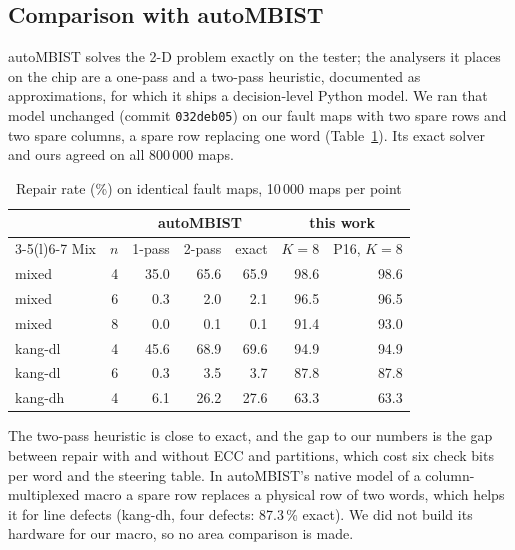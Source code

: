 \documentclass[conference]{IEEEtran}
\begin{document}
\subsection{Comparison with autoMBIST}
autoMBIST \cite{automb} solves the 2-D problem exactly on the tester; the analysers it places on the
chip are a one-pass and a two-pass heuristic, documented as approximations, for which it ships a
decision-level Python model. We ran that model unchanged (commit \texttt{032deb05}) on our fault maps
with two spare rows and two spare columns, a spare row replacing one word (Table~\ref{tab:amb}). Its
exact solver and ours agreed on all 800\,000 maps.

\begin{table}[t]
\caption{Repair rate (\%) on identical fault maps, 10\,000 maps per point}
\label{tab:amb}
\centering
\begin{tabular}{@{}lrrrrrr@{}}
\toprule
 & & \multicolumn{3}{c}{autoMBIST} & \multicolumn{2}{c}{this work} \\
\cmidrule(lr){3-5}\cmidrule(l){6-7}
Mix & $n$ & 1-pass & 2-pass & exact & $K{=}8$ & P16, $K{=}8$ \\
\midrule
mixed & 4 & 35.0 & 65.6 & 65.9 & 98.6 & 98.6 \\
mixed & 6 & 0.3 & 2.0 & 2.1 & 96.5 & 96.5 \\
mixed & 8 & 0.0 & 0.1 & 0.1 & 91.4 & 93.0 \\
kang-dl & 4 & 45.6 & 68.9 & 69.6 & 94.9 & 94.9 \\
kang-dl & 6 & 0.3 & 3.5 & 3.7 & 87.8 & 87.8 \\
kang-dh & 4 & 6.1 & 26.2 & 27.6 & 63.3 & 63.3 \\
\bottomrule
\end{tabular}
\end{table}

The two-pass heuristic is close to exact, and the gap to our numbers is the gap between repair with
and without ECC and partitions, which cost six check bits per word and the steering table. In
autoMBIST's native model of a column-multiplexed macro a spare row replaces a physical row of two
words, which helps it for line defects (kang-dh, four defects: 87.3\,\% exact). We did not build its
hardware for our macro, so no area comparison is made.
\end{document}
